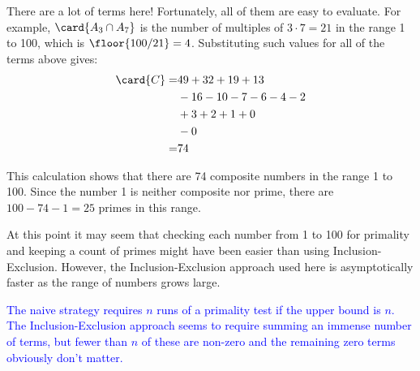 \begin{editingnotes}
There are a lot of terms here!  Fortunately, all of them are easy to
evaluate.  For example, $\card{A_3 \cap A_7}$ is the number of multiples
of $3 \cdot 7 = 21$ in the range 1 to 100, which is $\floor{100/21} = 4$.
\iffalse (Note that there is no reason to subtract 1 as we did when
evaluating $\card{A_m}$ above.)\fi Substituting such values for all of the
terms above gives:
\begin{align*}
\card{C}  = & 49 + 32 + 19 + 13 \\
            & - 16 - 10 - 7 - 6 - 4 - 2 \\
            & + 3 + 2 + 1 + 0 \\
            & - 0 \\
          = & 74
\end{align*}

This calculation shows that there are 74 composite numbers in the
range 1 to 100.  Since the number 1 is neither composite nor prime,
there are $100 - 74 - 1 = 25$ primes in this range.

At this point it may seem that checking each number from 1 to 100 for
primality and keeping a count of primes might have been easier than using
Inclusion-Exclusion.  However, the Inclusion-Exclusion approach used here
is asymptotically faster as the range of numbers grows large.

\textcolor{blue}{The naive strategy requires $n$ runs of a primality
  test if the upper bound is $n$.  The Inclusion-Exclusion approach
  seems to require summing an immense number of terms, but fewer than
  $n$ of these are non-zero and the remaining zero terms obviously
  don't matter.}
\end{editingnotes}

\endinput
